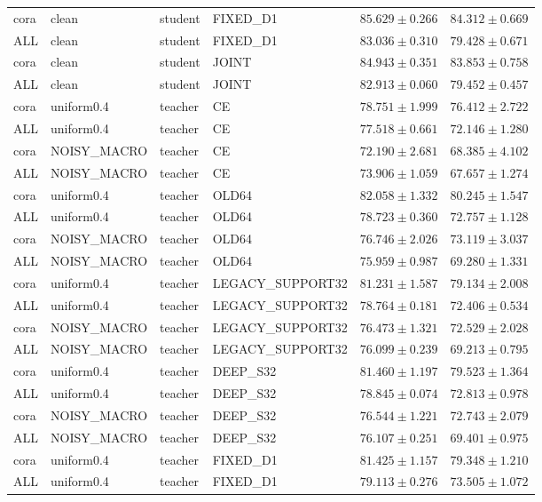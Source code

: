 \begin{longtable}{llllrr}
cora & clean & student & FIXED\_D1 & $85.629 \pm 0.266$ & $84.312 \pm 0.669$ \\
ALL & clean & student & FIXED\_D1 & $83.036 \pm 0.310$ & $79.428 \pm 0.671$ \\
cora & clean & student & JOINT & $84.943 \pm 0.351$ & $83.853 \pm 0.758$ \\
ALL & clean & student & JOINT & $82.913 \pm 0.060$ & $79.452 \pm 0.457$ \\
cora & uniform0.4 & teacher & CE & $78.751 \pm 1.999$ & $76.412 \pm 2.722$ \\
ALL & uniform0.4 & teacher & CE & $77.518 \pm 0.661$ & $72.146 \pm 1.280$ \\
cora & NOISY\_MACRO & teacher & CE & $72.190 \pm 2.681$ & $68.385 \pm 4.102$ \\
ALL & NOISY\_MACRO & teacher & CE & $73.906 \pm 1.059$ & $67.657 \pm 1.274$ \\
cora & uniform0.4 & teacher & OLD64 & $82.058 \pm 1.332$ & $80.245 \pm 1.547$ \\
ALL & uniform0.4 & teacher & OLD64 & $78.723 \pm 0.360$ & $72.757 \pm 1.128$ \\
cora & NOISY\_MACRO & teacher & OLD64 & $76.746 \pm 2.026$ & $73.119 \pm 3.037$ \\
ALL & NOISY\_MACRO & teacher & OLD64 & $75.959 \pm 0.987$ & $69.280 \pm 1.331$ \\
cora & uniform0.4 & teacher & LEGACY\_SUPPORT32 & $81.231 \pm 1.587$ & $79.134 \pm 2.008$ \\
ALL & uniform0.4 & teacher & LEGACY\_SUPPORT32 & $78.764 \pm 0.181$ & $72.406 \pm 0.534$ \\
cora & NOISY\_MACRO & teacher & LEGACY\_SUPPORT32 & $76.473 \pm 1.321$ & $72.529 \pm 2.028$ \\
ALL & NOISY\_MACRO & teacher & LEGACY\_SUPPORT32 & $76.099 \pm 0.239$ & $69.213 \pm 0.795$ \\
cora & uniform0.4 & teacher & DEEP\_S32 & $81.460 \pm 1.197$ & $79.523 \pm 1.364$ \\
ALL & uniform0.4 & teacher & DEEP\_S32 & $78.845 \pm 0.074$ & $72.813 \pm 0.978$ \\
cora & NOISY\_MACRO & teacher & DEEP\_S32 & $76.544 \pm 1.221$ & $72.743 \pm 2.079$ \\
ALL & NOISY\_MACRO & teacher & DEEP\_S32 & $76.107 \pm 0.251$ & $69.401 \pm 0.975$ \\
cora & uniform0.4 & teacher & FIXED\_D1 & $81.425 \pm 1.157$ & $79.348 \pm 1.210$ \\
ALL & uniform0.4 & teacher & FIXED\_D1 & $79.113 \pm 0.276$ & $73.505 \pm 1.072$ \\

\end{longtable}
